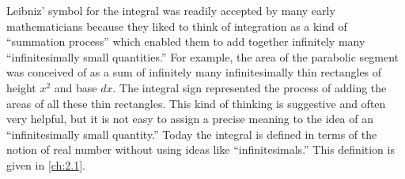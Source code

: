 \begin{note}
  Leibniz' symbol for the integral was readily accepted by many early mathematicians because they liked to think of integration as a kind of ``summation process'' which enabled them to add together infinitely many ``infinitesimally small quantities.''
  For example, the area of the parabolic segment was conceived of as a sum of infinitely many infinitesimally thin rectangles of height \(x^2\) and base \(dx\).
  The integral sign represented the process of adding the areas of all these thin rectangles.
  This kind of thinking is suggestive and often very helpful, but it is not easy to assign a precise meaning to the idea of an ``infinitesimally small quantity.''
  Today the integral is defined in terms of the notion of real number without using ideas like ``infinitesimals.''
  This definition is given in \cref{ch:2.1}.
\end{note}
